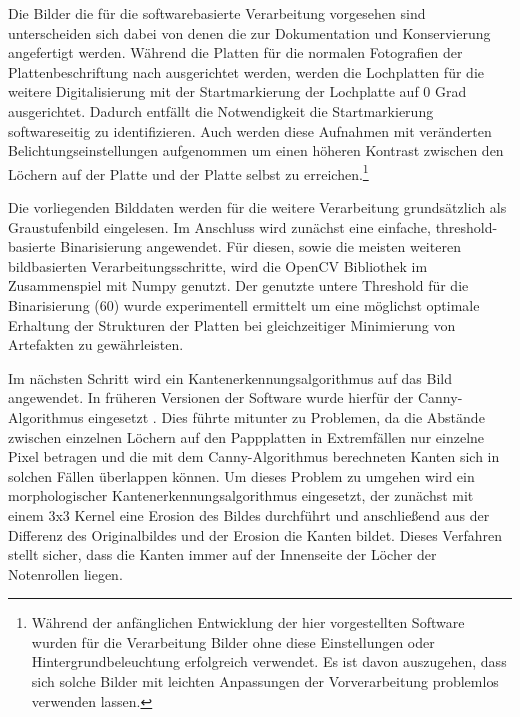 Die Bilder die für die softwarebasierte Verarbeitung vorgesehen sind unterscheiden sich dabei von denen die zur Dokumentation und Konservierung angefertigt werden.
Während die Platten für die normalen Fotografien der Plattenbeschriftung nach ausgerichtet werden, werden die Lochplatten für die weitere Digitalisierung mit der Startmarkierung der Lochplatte auf 0 Grad ausgerichtet.
Dadurch entfällt die Notwendigkeit die Startmarkierung softwareseitig zu identifizieren.
Auch werden diese Aufnahmen mit veränderten Belichtungseinstellungen aufgenommen um einen höheren Kontrast zwischen den Löchern auf der Platte und der Platte selbst zu erreichen.\footnote{Während der anfänglichen Entwicklung der hier vorgestellten Software wurden für die Verarbeitung Bilder ohne diese Einstellungen oder Hintergrundbeleuchtung erfolgreich verwendet. Es ist davon auszugehen, dass sich solche Bilder mit leichten Anpassungen der Vorverarbeitung problemlos verwenden lassen.}

Die vorliegenden Bilddaten werden für die weitere Verarbeitung grundsätzlich als Graustufenbild eingelesen.
Im Anschluss wird zunächst eine einfache, threshold-basierte Binarisierung angewendet.
Für diesen, sowie die meisten weiteren bildbasierten Verarbeitungsschritte, wird die OpenCV \parencite[]{opencv_library} Bibliothek im Zusammenspiel mit Numpy \parencite[]{harris2020array} genutzt.
Der genutzte untere Threshold für die Binarisierung (60) wurde experimentell ermittelt um eine möglichst optimale Erhaltung der Strukturen der Platten bei gleichzeitiger Minimierung von Artefakten zu gewährleisten.

Im nächsten Schritt wird ein Kantenerkennungsalgorithmus auf das Bild angewendet.
In früheren Versionen der Software wurde hierfür der Canny-Algorithmus eingesetzt \parencite[]{canny_1986}.
Dies führte mitunter zu Problemen, da die Abstände zwischen einzelnen Löchern auf den Pappplatten in Extremfällen nur einzelne Pixel betragen und die mit dem Canny-Algorithmus berechneten Kanten sich in solchen Fällen überlappen können.
Um dieses Problem zu umgehen wird ein morphologischer Kantenerkennungsalgorithmus eingesetzt, der zunächst mit einem 3x3 Kernel eine Erosion des Bildes durchführt und anschließend aus der Differenz des Originalbildes und der Erosion die Kanten bildet.
Dieses Verfahren stellt sicher, dass die Kanten immer auf der Innenseite der Löcher der Notenrollen liegen.


